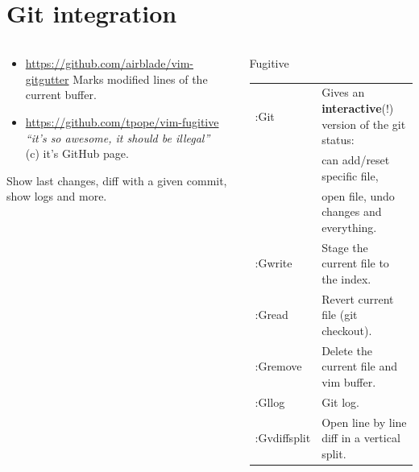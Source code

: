 \documentclass[aspectratio=169]{beamer}
\newcommand{\myurl}[1]{{\color{indigo}\url{#1}}}%
\begin{document}
\section*{Git integration}
\begin{frame}{\secname}
  \begin{columns}
    \begin{column}{0.5\textwidth}
  \begin{itemize}
    \item \myurl{https://github.com/airblade/vim-gitgutter}
      Marks modified lines of the current buffer.
    \item \myurl{https://github.com/tpope/vim-fugitive} \\ 
      \textit{``it's so awesome, it should be illegal''} \\(c) it's GitHub page.
  \end{itemize}
  Show last changes, diff with a given commit, show logs and more.
      
    \end{column}
    \begin{column}{0.6\textwidth}
      \begin{block}{Fugitive}
        \begin{tabular}{ll}
          :Git & Gives an \textbf{interactive}(!) version of the git status: \\
               & can add/reset specific file,   \\
               & open file, undo changes and everything. \\
         :Gwrite & Stage the current file to the index. \\
         :Gread  & Revert current file (git checkout). \\ 
         :Gremove & Delete the current file and vim buffer. \\
         :Gllog   & Git log. \\
         :Gvdiffsplit & Open line by line diff in a vertical split.

        \end{tabular}
        
      \end{block} 
    \end{column}
  \end{columns}
    
\end{frame}
\end{document}
